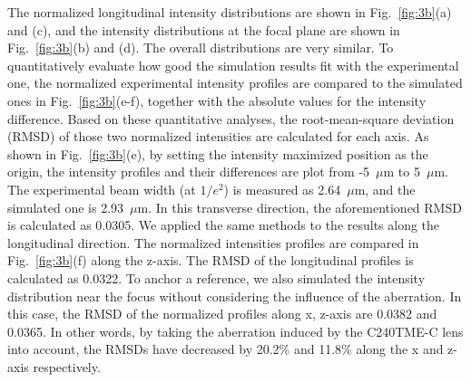 \documentclass[9pt,twocolumn,twoside]{osajnl}
\begin{document}
The normalized longitudinal intensity distributions are shown in Fig.~\ref{fig:3b}(a) and (c), and the intensity distributions at the focal plane are shown in Fig.~\ref{fig:3b}(b) and (d). The overall distributions are very similar. To quantitatively evaluate how good the simulation results fit with the experimental one, the normalized experimental intensity profiles are compared to the simulated ones in Fig.~\ref{fig:3b}(e-f), together with the absolute values for the intensity difference. Based on these quantitative analyses, the root-mean-square deviation (RMSD) of those two normalized intensities are calculated for each axis. As shown in Fig.~\ref{fig:3b}(e), by setting the intensity maximized position as the origin, the intensity profiles and their differences are plot from  -5~$\mu$m to 5~$\mu$m. The experimental beam width (at $1/e^2$) is measured as 2.64~$\mu$m, and the simulated one is 2.93~$\mu$m. In this transverse direction, the aforementioned RMSD is calculated as 0.0305. We applied the same methods to the results along the longitudinal direction. The normalized intensities profiles are compared in Fig.~\ref{fig:3b}(f) along the z-axis. The RMSD of the longitudinal profiles is calculated as 0.0322. To anchor a reference, we also simulated the intensity distribution near the focus without considering the influence of the aberration. In this case, the RMSD of the normalized profiles along x, z-axis are 0.0382 and 0.0365. In other words, by taking the aberration induced by the C240TME-C lens into account, the RMSDs have decreased by 20.2\% and 11.8\% along the x and z-axis respectively.
\end{document}

